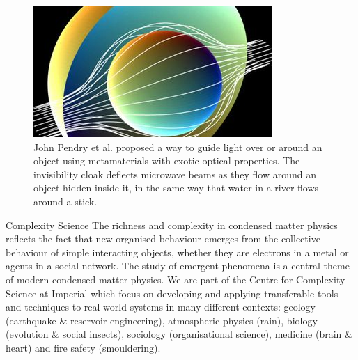 \documentclass[xcolor={table}]{beamer}
\begin{document}
\begin{frame}[fragile=singleslide,t]
\begin{columns}[onlytextwidth,T]
\begin{column}{.47\textwidth}
\begin{figure}
    \includegraphics[width=\columnwidth, height=0.15\textheight]{metamaterials.jpg}
    \caption{\footnotesize John Pendry et al. proposed a way to guide light over or around an object using metamaterials with exotic optical properties. The invisibility cloak deflects microwave beams as they flow around an object hidden inside it, in the same way that water in a river flows around a stick.}
\end{figure}

\begin{block}{Complexity Science}
The richness and complexity in condensed matter physics reflects the fact that
new organised behaviour emerges from the collective behaviour of simple
interacting objects, whether they are electrons in a metal or agents in a social
network. The study of emergent phenomena is a central theme of modern condensed
matter physics. We are part of the Centre for Complexity Science at Imperial
which focus on developing and applying transferable tools and techniques to real
world systems in many different contexts: geology (earthquake \& reservoir
engineering), atmospheric physics (rain), biology (evolution \& social insects),
sociology (organisational science), medicine (brain \& heart) and fire safety
(smouldering).
\end{block}


\end{column}
\end{columns}
\end{frame}
\end{document}
